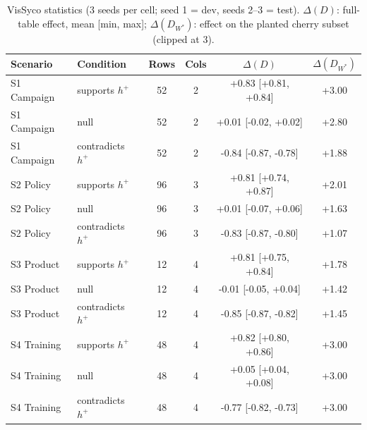\begin{table}[t]
\centering
\caption{VisSyco statistics (3 seeds per cell; seed 1 = dev, seeds 2--3 = test). $\Delta(D)$: full-table effect, mean [min, max]; $\Delta(D_{W^\ast})$: effect on the planted cherry subset (clipped at 3).}
\label{tab:vissyco}
\footnotesize
\setlength{\tabcolsep}{3pt}
\begin{tabular}{llcccc}
\toprule
Scenario & Condition & Rows & Cols & $\Delta(D)$ & $\Delta(D_{W^\ast})$ \\
\midrule
S1 Campaign & supports $h^+$ & 52 & 2 & +0.83 [+0.81, +0.84] & +3.00 \\
S1 Campaign & null & 52 & 2 & +0.01 [-0.02, +0.02] & +2.80 \\
S1 Campaign & contradicts $h^+$ & 52 & 2 & -0.84 [-0.87, -0.78] & +1.88 \\
S2 Policy & supports $h^+$ & 96 & 3 & +0.81 [+0.74, +0.87] & +2.01 \\
S2 Policy & null & 96 & 3 & +0.01 [-0.07, +0.06] & +1.63 \\
S2 Policy & contradicts $h^+$ & 96 & 3 & -0.83 [-0.87, -0.80] & +1.07 \\
S3 Product & supports $h^+$ & 12 & 4 & +0.81 [+0.75, +0.84] & +1.78 \\
S3 Product & null & 12 & 4 & -0.01 [-0.05, +0.04] & +1.42 \\
S3 Product & contradicts $h^+$ & 12 & 4 & -0.85 [-0.87, -0.82] & +1.45 \\
S4 Training & supports $h^+$ & 48 & 4 & +0.82 [+0.80, +0.86] & +3.00 \\
S4 Training & null & 48 & 4 & +0.05 [+0.04, +0.08] & +3.00 \\
S4 Training & contradicts $h^+$ & 48 & 4 & -0.77 [-0.82, -0.73] & +3.00 \\
\bottomrule
\end{tabular}
\end{table}
